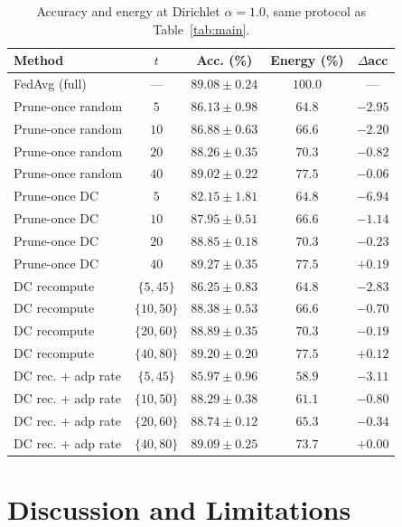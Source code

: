 \documentclass[conference]{IEEEtran}
\begin{document}
\begin{table}[htbp]
\caption{Accuracy and energy at Dirichlet $\alpha=1.0$, same protocol as Table~\ref{tab:main}.}
\label{tab:alpha1}
\begin{center}
\renewcommand{\arraystretch}{1.0}
\setlength{\tabcolsep}{2pt}
\begin{tabular}{lcccc}
\hline
\textbf{Method} & \textbf{$t$} & \textbf{Acc. (\%)} & \textbf{Energy (\%)} & \textbf{$\Delta$acc} \\
\hline
FedAvg (full) & --- & $89.08 \pm 0.24$ & $100.0$ & --- \\
\hline
Prune-once random & $5$ & $86.13 \pm 0.98$ & $64.8$ & $-2.95$ \\
Prune-once random & $10$ & $86.88 \pm 0.63$ & $66.6$ & $-2.20$ \\
Prune-once random & $20$ & $88.26 \pm 0.35$ & $70.3$ & $-0.82$ \\
Prune-once random & $40$ & $89.02 \pm 0.22$ & $77.5$ & $-0.06$ \\
\hline
Prune-once DC & $5$ & $82.15 \pm 1.81$ & $64.8$ & $-6.94$ \\
Prune-once DC & $10$ & $87.95 \pm 0.51$ & $66.6$ & $-1.14$ \\
Prune-once DC & $20$ & $88.85 \pm 0.18$ & $70.3$ & $-0.23$ \\
Prune-once DC & $40$ & $89.27 \pm 0.35$ & $77.5$ & $+0.19$ \\
\hline
DC recompute & $\{5,45\}$ & $86.25 \pm 0.83$ & $64.8$ & $-2.83$ \\
DC recompute & $\{10,50\}$ & $88.38 \pm 0.53$ & $66.6$ & $-0.70$ \\
DC recompute & $\{20,60\}$ & $88.89 \pm 0.35$ & $70.3$ & $-0.19$ \\
DC recompute & $\{40,80\}$ & $89.20 \pm 0.20$ & $77.5$ & $+0.12$ \\
\hline
DC rec. + adp rate & $\{5,45\}$ & $85.97 \pm 0.96$ & $58.9$ & $-3.11$ \\
DC rec. + adp rate & $\{10,50\}$ & $88.29 \pm 0.38$ & $61.1$ & $-0.80$ \\
DC rec. + adp rate & $\{20,60\}$ & $88.74 \pm 0.12$ & $65.3$ & $-0.34$ \\
DC rec. + adp rate & $\{40,80\}$ & $89.09 \pm 0.25$ & $73.7$ & $+0.00$ \\
\hline
\end{tabular}
\end{center}
\end{table}

\section{Discussion and Limitations}\label{sec:limits}
\end{document}
